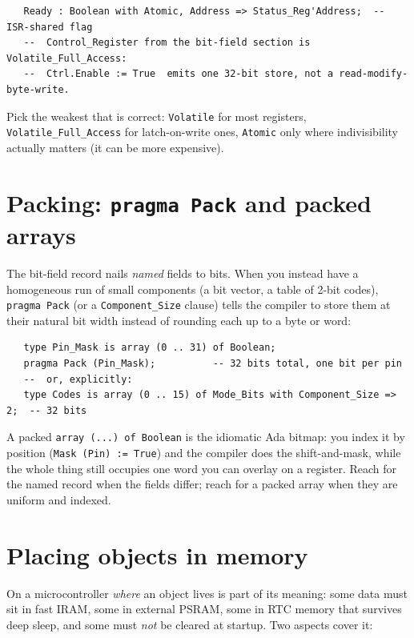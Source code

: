 \begin{lstlisting}
   Ready : Boolean with Atomic, Address => Status_Reg'Address;  -- ISR-shared flag
   --  Control_Register from the bit-field section is Volatile_Full_Access:
   --  Ctrl.Enable := True  emits one 32-bit store, not a read-modify-byte-write.
\end{lstlisting}

Pick the weakest that is correct: \texttt{Volatile} for most registers,
\texttt{Volatile\_Full\_Access} for latch-on-write ones, \texttt{Atomic} only
where indivisibility actually matters (it can be more expensive).

\section{Packing: \texttt{pragma Pack} and packed arrays}
\label{sec:pack}

The bit-field record nails \emph{named} fields to bits. When you instead have a
homogeneous run of small components (a bit vector, a table of 2-bit codes),
\texttt{pragma Pack} (or a \texttt{Component\_Size} clause) tells the compiler to
store them at their natural bit width instead of rounding each up to a byte or
word:

\begin{lstlisting}
   type Pin_Mask is array (0 .. 31) of Boolean;
   pragma Pack (Pin_Mask);          -- 32 bits total, one bit per pin
   --  or, explicitly:
   type Codes is array (0 .. 15) of Mode_Bits with Component_Size => 2;  -- 32 bits
\end{lstlisting}

A packed \texttt{array (...) of Boolean} is the idiomatic Ada bitmap: you index
it by position (\texttt{Mask (Pin) := True}) and the compiler does the
shift-and-mask, while the whole thing still occupies one word you can overlay on
a register. Reach for the named record when the fields differ; reach for a packed
array when they are uniform and indexed.

\section{Placing objects in memory}
\label{sec:placement}

On a microcontroller \emph{where} an object lives is part of its meaning: some
data must sit in fast IRAM, some in external PSRAM, some in RTC memory that
survives deep sleep, and some must \emph{not} be cleared at startup. Two aspects
cover it:

